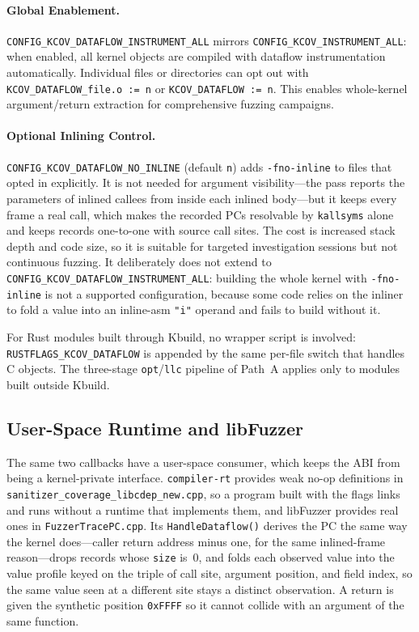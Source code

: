 \documentclass{article}
\begin{document}
\paragraph{Global Enablement.}
\texttt{CONFIG\_KCOV\_DATAFLOW\_INSTRUMENT\_ALL} mirrors
\texttt{CONFIG\_KCOV\_INSTRUMENT\_ALL}: when enabled, all kernel objects are
compiled with dataflow instrumentation automatically. Individual files or
directories can opt out with \texttt{KCOV\_DATAFLOW\_file.o := n} or
\texttt{KCOV\_DATAFLOW := n}. This enables whole-kernel argument/return
extraction for comprehensive fuzzing campaigns.

\paragraph{Optional Inlining Control.}
\texttt{CONFIG\_KCOV\_DATAFLOW\_NO\_INLINE} (default \texttt{n}) adds
\texttt{-fno-inline} to files that opted in explicitly. It is not needed for
argument visibility---the pass reports the parameters of inlined callees from
inside each inlined body---but it keeps every frame a real call, which makes
the recorded PCs resolvable by \texttt{kallsyms} alone and keeps records
one-to-one with source call sites. The cost is increased stack depth and code
size, so it is suitable for targeted investigation sessions but not continuous
fuzzing. It deliberately does not extend to
\texttt{CONFIG\_KCOV\_DATAFLOW\_INSTRUMENT\_ALL}: building the whole kernel
with \texttt{-fno-inline} is not a supported configuration, because some code
relies on the inliner to fold a value into an inline-asm \texttt{"i"} operand
and fails to build without it.

For Rust modules built through Kbuild, no wrapper script is involved:
\texttt{RUSTFLAGS\_KCOV\_DATAFLOW} is appended by the same per-file switch
that handles C objects. The three-stage \texttt{opt}/\texttt{llc} pipeline of
Path~A applies only to modules built outside Kbuild.

\subsection{User-Space Runtime and libFuzzer}\label{sec:libfuzzer}

The same two callbacks have a user-space consumer, which keeps the ABI from
being a kernel-private interface. \texttt{compiler-rt} provides weak no-op
definitions in \texttt{sanitizer\_coverage\_libcdep\_new.cpp}, so a program
built with the flags links and runs without a runtime that implements them, and
libFuzzer provides real ones in \texttt{FuzzerTracePC.cpp}. Its
\texttt{HandleDataflow()} derives the PC the same way the kernel does---caller
return address minus one, for the same inlined-frame reason---drops records
whose \texttt{size} is~0, and folds each observed value into the value profile
keyed on the triple of call site, argument position, and field index, so the
same value seen at a different site stays a distinct observation. A return is
given the synthetic position \texttt{0xFFFF} so it cannot collide with an
argument of the same function.
\end{document}

